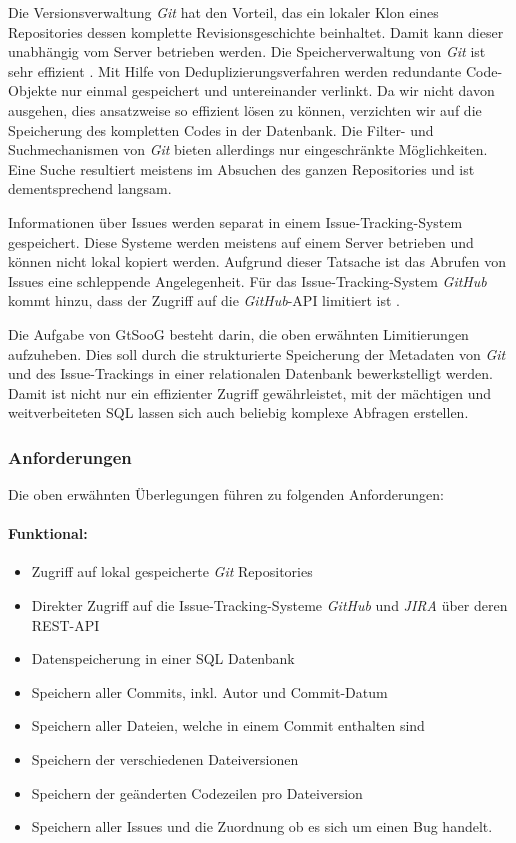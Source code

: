 \documentclass[10pt, a4paper]{article}
\begin{document}
Die Versionsverwaltung \emph{Git} hat den Vorteil, das ein lokaler Klon eines Repositories dessen komplette Revisionsgeschichte beinhaltet. Damit kann dieser unabhängig vom Server betrieben werden. Die Speicherverwaltung von \emph{Git} ist sehr effizient \cite{githubInternalsGitObjects}. Mit Hilfe von Deduplizierungsverfahren werden redundante Code-Objekte nur einmal gespeichert und untereinander verlinkt. Da wir nicht davon ausgehen, dies ansatzweise so effizient lösen zu können, verzichten wir auf die Speicherung des kompletten Codes in der Datenbank. Die Filter- und Suchmechanismen von \emph{Git} bieten allerdings nur eingeschränkte Möglichkeiten. Eine Suche resultiert meistens im Absuchen des ganzen Repositories und ist dementsprechend langsam.

Informationen über Issues werden separat in einem Issue-Tracking-System gespeichert. Diese Systeme werden meistens auf einem Server betrieben und können nicht lokal kopiert werden. Aufgrund dieser Tatsache ist das Abrufen von Issues eine schleppende Angelegenheit. Für das Issue-Tracking-System \emph{GitHub} kommt hinzu, dass der Zugriff auf die \emph{GitHub}-\acs{API} limitiert ist \cite{github:ratelimit}.

Die Aufgabe von GtSooG besteht darin, die oben erwähnten Limitierungen aufzuheben. Dies soll durch die strukturierte Speicherung der Metadaten von \emph{Git} und des Issue-Trackings in einer relationalen Datenbank bewerkstelligt werden. Damit ist nicht nur ein effizienter Zugriff gewährleistet, mit der mächtigen und weitverbeiteten \ac{SQL} lassen sich auch beliebig komplexe Abfragen erstellen.

\subsubsection{Anforderungen}
Die oben erwähnten Überlegungen führen zu folgenden Anforderungen:

\paragraph{Funktional:}
\begin{itemize}
	\item Zugriff auf lokal gespeicherte \emph{Git} Repositories
	\item Direkter Zugriff auf die Issue-Tracking-Systeme \emph{GitHub} und \emph{JIRA} über deren \acs{REST}-\acs{API}
	\item Datenspeicherung in einer \ac{SQL} Datenbank
	\item Speichern aller Commits, inkl. Autor und Commit-Datum
	\item Speichern aller Dateien, welche in einem Commit enthalten sind
	\item Speichern der verschiedenen Dateiversionen
	\item Speichern der geänderten Codezeilen pro Dateiversion
	\item Speichern aller Issues und die Zuordnung ob es sich um einen Bug handelt.
\end{itemize} 
\end{document}
